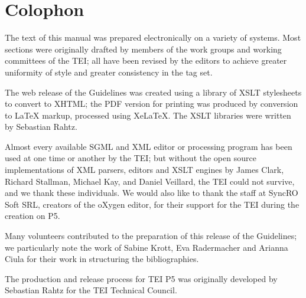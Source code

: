 
\section[{Colophon}]{Colophon}\label{COL}\par
The text of this manual was prepared electronically on a variety of systems. Most sections were originally drafted by members of the work groups and working committees of the TEI; all have been revised by the editors to achieve greater uniformity of style and greater consistency in the tag set.\par
The web release of the Guidelines was created using a library of XSLT stylesheets to convert to XHTML; the PDF version for printing was produced by conversion to LaTeX markup, processed using XeLaTeX. The XSLT libraries were written by Sebastian Rahtz.\par
Almost every available SGML and XML editor or processing program has been used at one time or another by the TEI; but without the open source implementations of XML parsers, editors and XSLT engines by James Clark, Richard Stallman, Michael Kay, and Daniel Veillard, the TEI could not survive, and we thank these individuals. We would also like to thank the staff at SyncRO Soft SRL, creators of the oXygen editor, for their support for the TEI during the creation on P5.\par
Many volunteers contributed to the preparation of this release of the Guidelines; we particularly note the work of Sabine Krott, Eva Radermacher and Arianna Ciula for their work in structuring the bibliographies.\par
The production and release process for TEI P5 was originally developed by Sebastian Rahtz for the TEI Technical Council.